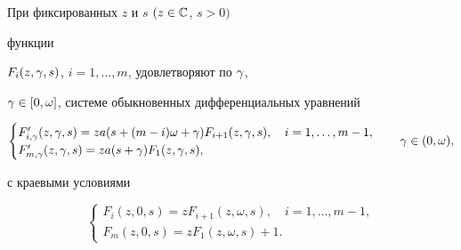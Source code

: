 \begin{lem} При фиксированных $z$ и $s$ $(z\in \Bbb{C}$, $s>0)$


функции


$F_{i}(z,\gamma,s)$, $i=1,\dotsc,m$, удовлетворяют по $\gamma$,


$\gamma\in[0,\omega]$, системе обыкновенных дифференциальных уравнений


\begin{equation}


\begin{cases}


F'_{i,\g}(z,\g,s)=za(s+(m-i)\omega+\g)F_{i+1}(z,\g,s),\quad i=1,\dotsc,m-1,\\


F'_{m,\g}(z,\g,s)=za(s+\g)F_{1}(z,\g,s),


\end{cases}


\quad \g \in(0,\omega),


\end{equation}


с краевыми условиями


\begin{equation}


\begin{cases}


F_{i}(z,0,s)=zF_{i+1}(z,\omega,s),\quad i=1,\dots,m-1,\\


F_{m}(z,0,s)=zF_{1}(z,\omega,s)+1.


\end{cases}


\end{equation}


\end{lem}





